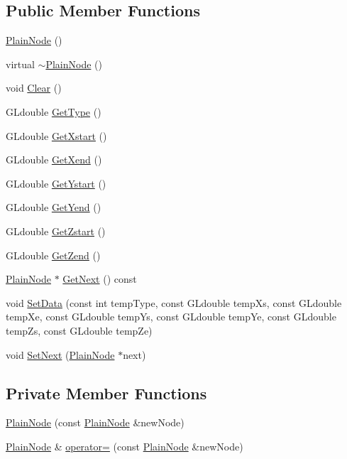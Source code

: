 \subsection*{Public Member Functions}
\begin{DoxyCompactItemize}
\item 
\hyperlink{class_plain_node_a89717edd4c35360b3f0794952d13701a}{Plain\+Node} ()
\item 
virtual \hyperlink{class_plain_node_aa15aa2126be8eb0366f12134172d11ff}{$\sim$\+Plain\+Node} ()
\item 
void \hyperlink{class_plain_node_ade7970c1699be78baf7aefea6f8eb6b7}{Clear} ()
\item 
G\+Ldouble \hyperlink{class_plain_node_a92a67076341f1facb73017b158626885}{Get\+Type} ()
\item 
G\+Ldouble \hyperlink{class_plain_node_a85adb877e9592e4c6a02e529d6a0f88a}{Get\+Xstart} ()
\item 
G\+Ldouble \hyperlink{class_plain_node_a1a5b063da3d3e818012ab62c26578b64}{Get\+Xend} ()
\item 
G\+Ldouble \hyperlink{class_plain_node_ab2b832010948f49b45f7b12962b26a79}{Get\+Ystart} ()
\item 
G\+Ldouble \hyperlink{class_plain_node_afe6e74faec6b6d1f1e1584630e6a1cb0}{Get\+Yend} ()
\item 
G\+Ldouble \hyperlink{class_plain_node_a38912cf44f7dd4bebd7c96d15fce281f}{Get\+Zstart} ()
\item 
G\+Ldouble \hyperlink{class_plain_node_ad5a0b8555f754557b89ced6f4c14aa53}{Get\+Zend} ()
\item 
\hyperlink{class_plain_node}{Plain\+Node} $\ast$ \hyperlink{class_plain_node_a34f55330c3e261b76b9086fec5928386}{Get\+Next} () const 
\item 
void \hyperlink{class_plain_node_a566db8fc78c8b4dea13373f908a53577}{Set\+Data} (const int temp\+Type, const G\+Ldouble temp\+Xs, const G\+Ldouble temp\+Xe, const G\+Ldouble temp\+Ys, const G\+Ldouble temp\+Ye, const G\+Ldouble temp\+Zs, const G\+Ldouble temp\+Ze)
\item 
void \hyperlink{class_plain_node_afe5be77c2dfbf7447105f0ea722e77f1}{Set\+Next} (\hyperlink{class_plain_node}{Plain\+Node} $\ast$next)
\end{DoxyCompactItemize}
\subsection*{Private Member Functions}
\begin{DoxyCompactItemize}
\item 
\hyperlink{class_plain_node_a2d924a1ecee05104dedde475ced5cd22}{Plain\+Node} (const \hyperlink{class_plain_node}{Plain\+Node} \&new\+Node)
\item 
\hyperlink{class_plain_node}{Plain\+Node} \& \hyperlink{class_plain_node_a496412bf61f1803e08a6d3a7a0fb726e}{operator=} (const \hyperlink{class_plain_node}{Plain\+Node} \&new\+Node)
\end{DoxyCompactItemize}
